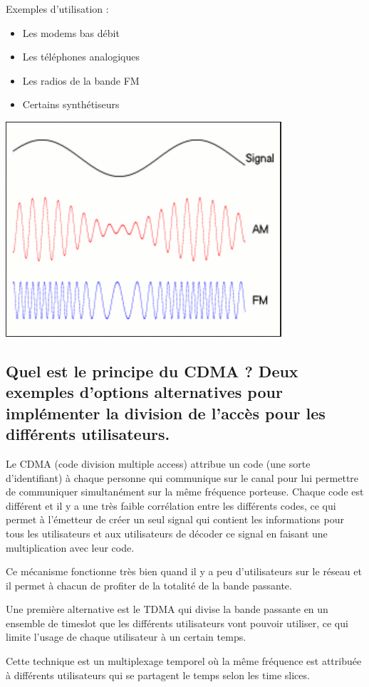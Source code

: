 Exemples d'utilisation :
\begin{itemize}
    \item Les modems bas débit
    \item Les téléphones analogiques
    \item Les radios de la bande FM
    \item Certains synthétiseurs
\end{itemize}

\begin{center}
    \includegraphics[width=0.5\linewidth]{img/modulation_am_fm.png}
\end{center}

\subsection{Quel est le principe du CDMA ? Deux exemples d'options alternatives pour implémenter la division de l'accès pour les différents utilisateurs.}

Le CDMA (code division multiple access) attribue un code (une sorte d'identifiant) à chaque personne qui communique sur le canal pour lui permettre de communiquer simultanément sur la même fréquence porteuse.  Chaque code est différent et il y a une très faible corrélation entre les différents codes, ce qui permet à l'émetteur de créer un seul signal qui contient les informations pour tous les utilisateurs et aux utilisateurs de décoder ce signal en faisant une multiplication avec leur code.

Ce mécanisme fonctionne très bien quand il y a peu d'utilisateurs sur le réseau et il permet à chacun de profiter de la totalité de la bande passante.

Une première alternative est le TDMA qui divise la bande passante en un ensemble de timeslot que les différents utilisateurs vont pouvoir utiliser, ce qui limite l'usage de chaque utilisateur à un certain temps.

Cette technique est un multiplexage temporel où la même fréquence est attribuée à différents utilisateurs qui se partagent le temps selon les time slices.

